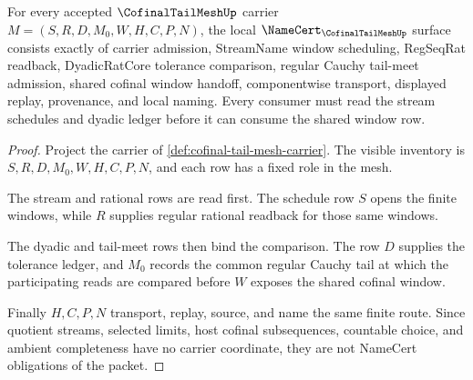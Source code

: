 \begin{theorem}
\label{thm:cofinal-tail-mesh-namecert-obligations}
For every accepted $\CofinalTailMeshUp$ carrier $M=(S,R,D,M_0,W,H,C,P,N)$, the local $\NameCert_{\CofinalTailMeshUp}$ surface consists exactly of carrier admission, StreamName window scheduling, RegSeqRat readback, DyadicRatCore tolerance comparison, regular Cauchy tail-meet admission, shared cofinal window handoff, componentwise transport, displayed replay, provenance, and local naming. Every consumer must read the stream schedules and dyadic ledger before it can consume the shared window row.
\end{theorem}
\begin{proof}
Project the carrier of \autoref{def:cofinal-tail-mesh-carrier}. The visible inventory is $S,R,D,M_0,W,H,C,P,N$, and each row has a fixed role in the mesh.

The stream and rational rows are read first. The schedule row $S$ opens the finite windows, while $R$ supplies regular rational readback for those same windows.

The dyadic and tail-meet rows then bind the comparison. The row $D$ supplies the tolerance ledger, and $M_0$ records the common regular Cauchy tail at which the participating reads are compared before $W$ exposes the shared cofinal window.

Finally $H,C,P,N$ transport, replay, source, and name the same finite route. Since quotient streams, selected limits, host cofinal subsequences, countable choice, and ambient completeness have no carrier coordinate, they are not NameCert obligations of the packet.
\end{proof}

